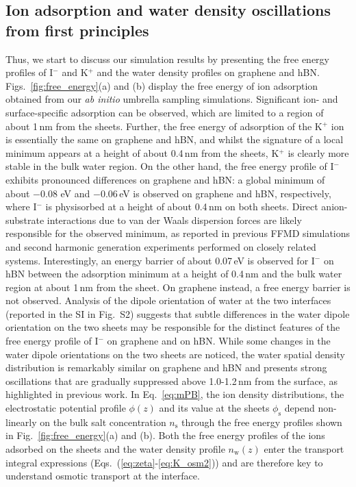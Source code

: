 \documentclass[journal=ancac3,manuscript=article,layout=twocolumn]{achemso}
\newcommand{\phis}{\phi_\text{s}}
\newcommand{\ns}{n_\text{s}}
\begin{document}
\subsection{Ion adsorption and water density oscillations
from first principles}
Thus, we start to discuss our simulation results by
presenting the free energy profiles
of I$^{-}$ and K$^{+}$ and the water density
profiles on graphene and hBN.
Figs.~\ref{fig:free_energy}(a) and (b)
display the free energy of ion adsorption
obtained from our \textit{ab initio} umbrella sampling
simulations. Significant ion- and surface-specific
adsorption can be observed,
which are limited to a
region of about 1\,nm from the sheets.
Further, the free energy of adsorption of the K$^+$
ion is essentially the same on
graphene and hBN, and whilst the signature of a local minimum appears
at a height of about 0.4\,nm from the sheets, K$^+$ is clearly more stable
in the bulk water region. On the other hand,
the free energy profile of I$^-$ exhibits pronounced differences
on graphene and hBN: a global minimum of about
$-0.08$ eV and $-0.06$\,eV is observed on graphene and hBN, respectively,
where I$^-$ is physisorbed at a height of about 0.4\,nm on both sheets.
Direct anion-substrate interactions due to van der Waals
dispersion forces are likely responsible for the
observed minimum, as reported in previous
FFMD simulations and second harmonic generation experiments
performed on closely related systems.\cite{mccaffrey2017mechanism}
Interestingly, an energy barrier of
about 0.07\,eV is observed for I$^-$
on hBN between the adsorption minimum at a height of 0.4\,nm
and the bulk water region at about 1\,nm from the sheet.
On graphene instead, a free energy barrier is not
observed. Analysis of the dipole orientation of water at the
two interfaces (reported in the SI in Fig.~S2) suggests that subtle
differences in the water dipole orientation
on the two sheets may be
responsible for the distinct features of the
free energy profile of I$^{-}$
on graphene and on hBN.
While some changes in the water dipole orientations on the
two sheets are noticed,
the water spatial density distribution
is remarkably similar on graphene and hBN and
presents strong oscillations
that are gradually suppressed above 1.0-1.2\,nm
from the surface, as highlighted in previous work\cite{tocci2014friction}.
In Eq.~\eqref{eq:mPB},
the ion density distributions, the
electrostatic potential profile $\phi(z)$
and its value at the sheets
$\phis$ depend non-linearly
on the bulk salt concentration $\ns$
through the free energy profiles shown in
Fig.~\ref{fig:free_energy}(a) and (b).
Both the free energy profiles of
the ions adsorbed on the sheets
and the water density profile $n_\text{w}(z)$
enter the transport integral expressions (Eqs.~(\ref{eq:zeta}-\ref{eq:K_osm2}))
and are therefore key to
understand osmotic transport at the interface.
\end{document}
